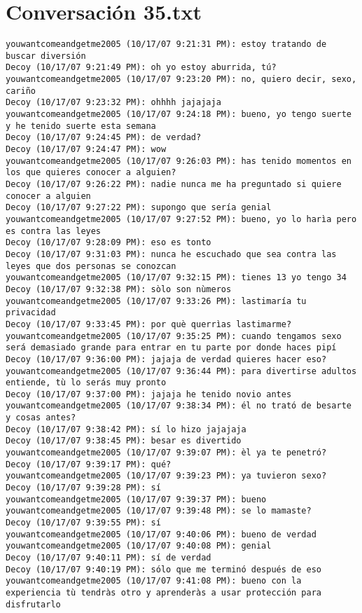 \section{Conversaci\'on 35.txt}

\begin{verbatim}
youwantcomeandgetme2005 (10/17/07 9:21:31 PM): estoy tratando de buscar diversión
Decoy (10/17/07 9:21:49 PM): oh yo estoy aburrida, tú?
youwantcomeandgetme2005 (10/17/07 9:23:20 PM): no, quiero decir, sexo, cariño
Decoy (10/17/07 9:23:32 PM): ohhhh jajajaja
youwantcomeandgetme2005 (10/17/07 9:24:18 PM): bueno, yo tengo suerte y he tenido suerte esta semana
Decoy (10/17/07 9:24:45 PM): de verdad?
Decoy (10/17/07 9:24:47 PM): wow
youwantcomeandgetme2005 (10/17/07 9:26:03 PM): has tenido momentos en los que quieres conocer a alguien?
Decoy (10/17/07 9:26:22 PM): nadie nunca me ha preguntado si quiere conocer a alguien
Decoy (10/17/07 9:27:22 PM): supongo que sería genial
youwantcomeandgetme2005 (10/17/07 9:27:52 PM): bueno, yo lo harìa pero es contra las leyes
Decoy (10/17/07 9:28:09 PM): eso es tonto
Decoy (10/17/07 9:31:03 PM): nunca he escuchado que sea contra las leyes que dos personas se conozcan
youwantcomeandgetme2005 (10/17/07 9:32:15 PM): tienes 13 yo tengo 34
Decoy (10/17/07 9:32:38 PM): sòlo son nùmeros
youwantcomeandgetme2005 (10/17/07 9:33:26 PM): lastimaría tu privacidad
Decoy (10/17/07 9:33:45 PM): por què querrìas lastimarme?
youwantcomeandgetme2005 (10/17/07 9:35:25 PM): cuando tengamos sexo será demasiado grande para entrar en tu parte por donde haces pipí
Decoy (10/17/07 9:36:00 PM): jajaja de verdad quieres hacer eso?
youwantcomeandgetme2005 (10/17/07 9:36:44 PM): para divertirse adultos entiende, tù lo serás muy pronto
Decoy (10/17/07 9:37:00 PM): jajaja he tenido novio antes
youwantcomeandgetme2005 (10/17/07 9:38:34 PM): él no trató de besarte y cosas antes?
Decoy (10/17/07 9:38:42 PM): sí lo hizo jajajaja
Decoy (10/17/07 9:38:45 PM): besar es divertido
youwantcomeandgetme2005 (10/17/07 9:39:07 PM): èl ya te penetró?
Decoy (10/17/07 9:39:17 PM): qué?
youwantcomeandgetme2005 (10/17/07 9:39:23 PM): ya tuvieron sexo?
Decoy (10/17/07 9:39:28 PM): sí
youwantcomeandgetme2005 (10/17/07 9:39:37 PM): bueno
youwantcomeandgetme2005 (10/17/07 9:39:48 PM): se lo mamaste?
Decoy (10/17/07 9:39:55 PM): sí
youwantcomeandgetme2005 (10/17/07 9:40:06 PM): bueno de verdad
youwantcomeandgetme2005 (10/17/07 9:40:08 PM): genial
Decoy (10/17/07 9:40:11 PM): sí de verdad
Decoy (10/17/07 9:40:19 PM): sólo que me terminó después de eso
youwantcomeandgetme2005 (10/17/07 9:41:08 PM): bueno con la experiencia tù tendràs otro y aprenderàs a usar protección para disfrutarlo

\end{verbatim}

